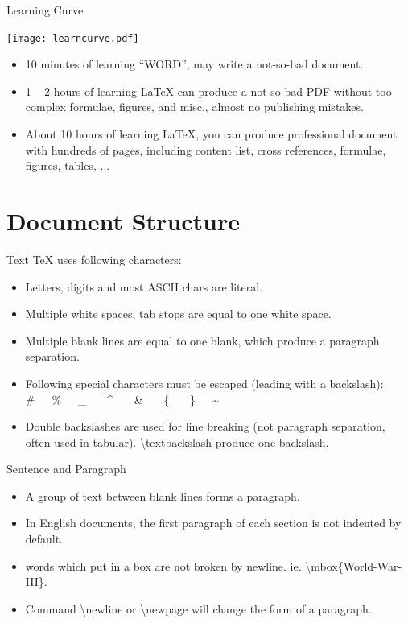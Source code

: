 \documentclass[10pt]{beamer}
\begin{document}
\begin{frame}{Learning Curve}
\begin{center}
    \texttt{[image: learncurve.pdf]}
\end{center}

\begin{itemize}
    \item 10 minutes of learning ``WORD'', may write a not-so-bad document.
    \item 1 -- 2 hours of learning \LaTeX{} can produce a not-so-bad
        PDF without too complex formulae, figures, and misc., almost
        no publishing mistakes.
    \item About 10 hours of learning \LaTeX{}, you can produce
        professional document with hundreds
        of pages, including content list, cross references,
        formulae, figures, tables, ...
\end{itemize}
\end{frame}

\section{Document Structure}
\begin{frame}{Text}
    \TeX{} uses following characters:
\begin{itemize}
    \item Letters, digits and most ASCII chars are literal.
    \item Multiple white spaces, tab stops are equal to one white space.
    \item Multiple blank lines are equal to one blank, which produce
        a paragraph separation.
    \item Following special characters must be escaped (leading with a backslash):\\
        \#\ \ \ \%\ \ \ \_ \ \ \ \^{} \ \ \ \& \ \ \ \{ \ \ \ \}\ \ \ \~{}
    \item Double backslashes are used for line breaking
        (not paragraph separation, often used in tabular).
        \alert{\textbackslash textbackslash} produce one backslash.
\end{itemize}
\end{frame}

\begin{frame}{Sentence and Paragraph}
\begin{itemize}
    \item A group of text between blank lines forms a paragraph.
    \item In English documents, the first paragraph of each section
        is not indented by default.
    \item words which put in a box are not broken by newline. ie.
        \textbackslash mbox\{World-War-III\}.
    \item Command \alert{\textbackslash newline} or
        \alert{\textbackslash newpage} will change the form of a paragraph.
\end{itemize}
\end{frame}
\end{document}
